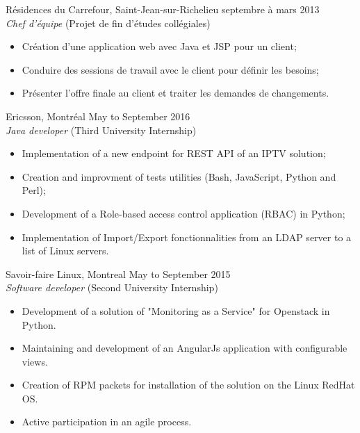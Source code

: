 \documentclass{res}
\newcommand{\inEnglish}[1]{#1}
\begin{document}
\begin{resume}
{	%
	Résidences du Carrefour, Saint-Jean-sur-Richelieu
	\hfill septembre à mars 2013 \\
	{\sl Chef d'équipe} \hfill (Projet de fin d'études collégiales)
	\vspace{0.05in}

	\begin{itemize} \itemsep -2pt
		\item Création d’une application web avec Java et JSP pour un client;
		\item Conduire des sessions de travail avec le client pour définir les besoins;
		\item Présenter l’offre finale au client et traiter les demandes de changements.
	\end{itemize}

}

\inEnglish{
	Ericsson, Montréal\footnotemark
	\hfill May to September 2016 \\
	{\sl Java developer} \hfill (Third University Internship)
	\vspace{0.05in}

	\begin{itemize} \itemsep -2pt
		\item Implementation of a new endpoint for REST API of an IPTV solution;
		\item Creation and improvment of tests utilities (Bash, JavaScript, Python and Perl);
		\item Development of a Role-based access control application (RBAC) in Python;
		\item Implementation of Import/Export fonctionnalities from an LDAP server to a list of Linux servers.
	\end{itemize}

	Savoir-faire Linux, Montreal
	\hfill May to September 2015 \\
	{\sl Software developer} \hfill (Second University Internship)
	\vspace{0.05in}

	\begin{itemize} \itemsep -2pt
		\item Development of a solution of "Monitoring as a Service" for Openstack in Python.
		\item Maintaining and development of an AngularJs application with configurable views.
		\item Creation of RPM packets for installation of the solution on the Linux RedHat OS.
		\item Active participation in an agile process.
	\end{itemize}

}
\end{resume}
\end{document}
